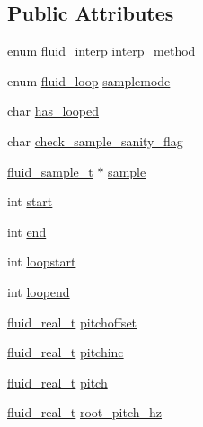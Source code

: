 \subsection*{Public Attributes}
\begin{DoxyCompactItemize}
\item 
enum \hyperlink{synth_8h_a4a2efef77b267500dd9c19c0dc9e4633}{fluid\+\_\+interp} \hyperlink{struct__fluid__rvoice__dsp__t_ac7992fd0a83c96a53b70722a958d3abd}{interp\+\_\+method}
\item 
enum \hyperlink{fluid__rvoice_8h_a27ec752422f9291b77de7217c0f02f4f}{fluid\+\_\+loop} \hyperlink{struct__fluid__rvoice__dsp__t_acdf7fe7cf31781b94b0c986d137ba85a}{samplemode}
\item 
char \hyperlink{struct__fluid__rvoice__dsp__t_a3cd4d57ea2d5f27cdcab0bd331b5c3aa}{has\+\_\+looped}
\item 
char \hyperlink{struct__fluid__rvoice__dsp__t_a70d4a20de04bca1e790efae49f815e82}{check\+\_\+sample\+\_\+sanity\+\_\+flag}
\item 
\hyperlink{types_8h_abf9174d452679ca1a4ee7d693fb773cf}{fluid\+\_\+sample\+\_\+t} $\ast$ \hyperlink{struct__fluid__rvoice__dsp__t_ae4141b3e3f3af1dbd827e2d75d86066d}{sample}
\item 
int \hyperlink{struct__fluid__rvoice__dsp__t_ac145d0e4a023f5b5a209c56f3652790a}{start}
\item 
int \hyperlink{struct__fluid__rvoice__dsp__t_ae5676614fdc0b0a9c4b90ed314c17fb3}{end}
\item 
int \hyperlink{struct__fluid__rvoice__dsp__t_ab3019cec8eebb7c4d622918bdb4342aa}{loopstart}
\item 
int \hyperlink{struct__fluid__rvoice__dsp__t_a5a363ff3f38d843fc7e942e346ad2d2b}{loopend}
\item 
\hyperlink{fluidsynth__priv_8h_a9e96f0917747b69cabb7c671bc693dbb}{fluid\+\_\+real\+\_\+t} \hyperlink{struct__fluid__rvoice__dsp__t_a9daf10c706debc6dbb7dfdf460e9d4b4}{pitchoffset}
\item 
\hyperlink{fluidsynth__priv_8h_a9e96f0917747b69cabb7c671bc693dbb}{fluid\+\_\+real\+\_\+t} \hyperlink{struct__fluid__rvoice__dsp__t_a33195e9f36595ebbbda908bde46256b3}{pitchinc}
\item 
\hyperlink{fluidsynth__priv_8h_a9e96f0917747b69cabb7c671bc693dbb}{fluid\+\_\+real\+\_\+t} \hyperlink{struct__fluid__rvoice__dsp__t_a85b5adce3ef83cfb096512ec38b060a2}{pitch}
\item 
\hyperlink{fluidsynth__priv_8h_a9e96f0917747b69cabb7c671bc693dbb}{fluid\+\_\+real\+\_\+t} \hyperlink{struct__fluid__rvoice__dsp__t_a1d0c1426a66b8b286560b641acc76b01}{root\+\_\+pitch\+\_\+hz}

\end{DoxyCompactItemize}
